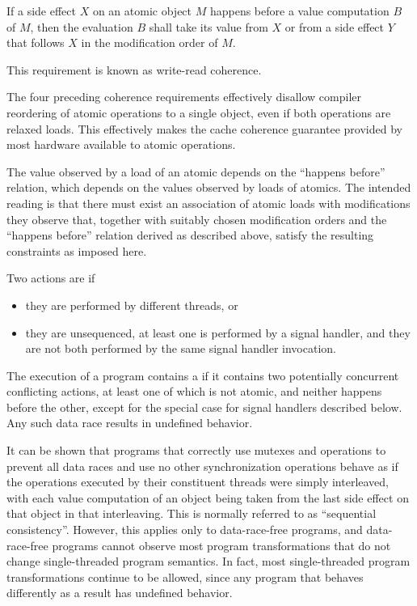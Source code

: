 \pnum
{}%
If a
%
side effect $X$ on an atomic object $M$ happens before a value
computation $B$ of $M$, then the evaluation $B$ shall take its
value from $X$ or from a
%
side effect $Y$ that follows $X$ in the modification order of $M$.
\begin{note}
This requirement is known as write-read coherence.
\end{note}

\pnum
\begin{note}
The four preceding coherence requirements effectively disallow
compiler reordering of atomic operations to a single object, even if both
operations are relaxed loads. This effectively makes the cache coherence
guarantee provided by most hardware available to \Cpp{} atomic operations.
\end{note}

\pnum
\begin{note}
The value observed by a load of an atomic depends on the ``happens
before'' relation, which depends on the values observed by loads of atomics.
The intended reading is that there must exist an
association of atomic loads with modifications they observe that, together with
suitably chosen modification orders and the ``happens before'' relation derived
as described above, satisfy the resulting constraints as imposed here.
\end{note}

\pnum
Two actions are  if
\begin{itemize}
\item they are performed by different threads, or
\item they are unsequenced, at least one is performed by a signal handler, and
they are not both performed by the same signal handler invocation.
\end{itemize}
The execution of a program contains a  if it contains two
potentially concurrent conflicting actions, at least one of which is not atomic,
and neither happens before the other,
except for the special case for signal handlers described below.
Any such data race results in undefined
behavior.
\begin{note}
It can be shown that programs that correctly use mutexes
and  operations to prevent all data races and use no
other synchronization operations behave as if the operations executed by their
constituent threads were simply interleaved, with each
%
value computation of an
object being taken from the last
%
side effect on that object in that
interleaving. This is normally referred to as ``sequential consistency''.
However, this applies only to data-race-free programs, and data-race-free
programs cannot observe most program transformations that do not change
single-threaded program semantics. In fact, most single-threaded program
transformations continue to be allowed, since any program that behaves
differently as a result has undefined behavior.
\end{note}


